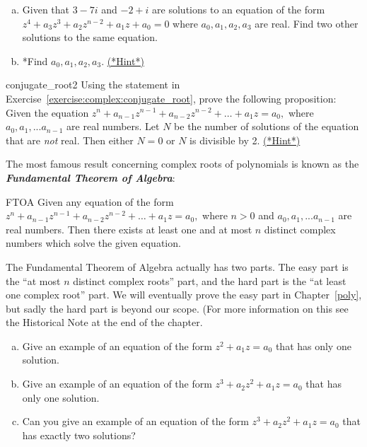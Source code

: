 {\begin{exercise}{62} 
\begin{enumerate}[(a)]
\item
Given that $3 - 7i$ and $-2+i$ are solutions to an equation of the form $z^4 + a_{3}z^{3} + a_{2} z^{n-2}+ a_1 z + a_0 = 0$ where $a_0, a_1, a_2, a_3$ are real. Find two other solutions to the same equation.
\item
*Find $a_0, a_1, a_2, a_3$. 
\hyperref[sec:complex:hints]{(*Hint*)}
\end{enumerate}
\end{exercise}

\begin{exercise}{conjugate_root2}
Using the statement in Exercise~\ref{exercise:complex:conjugate_root}, prove the following proposition:
Given the equation  $z^n + a_{n-1}z^{n-1} + a_{n-2} z^{n-2} + \ldots + a_1 z =a_0,$ where $a_0, a_1, ... a_{n-1}$ are real numbers. Let $N$ be the number of solutions of the equation that are \emph{not} real. Then either $N=0$ or $N$ is divisible by 2. 
\hyperref[sec:complex:hints]{(*Hint*)}
\end{exercise}

The most famous result concerning complex roots of polynomials is known as the {\bf \emph{Fundamental Theorem of Algebra}}:

\begin{prop}{FTOA} Given any equation of the form $z^n + a_{n-1}z^{n-1} + a_{n-2} z^{n-2} + \ldots + a_1 z =a_0,$ where $n>0$ and $a_0, a_1, ... a_{n-1}$ are real numbers. Then there exists at least one and at most $n$ distinct complex numbers which solve the given equation. 
\end{prop}

The Fundamental Theorem of Algebra actually has two parts. The easy part is the ``at most $n$ distinct complex roots'' part, and the hard part is the ``at least one complex root'' part. We will eventually prove the easy part in Chapter~\ref{poly}, but sadly the hard part is beyond our scope. (For more information on this see the Historical Note at the end of the chapter.

\begin{exercise}{70}
\begin{enumerate}[(a)]
\item
Give an example of an equation of the form $z^2 + a_1z = a_0$ that has only one solution.
\item
Give an example of an equation of the form $z^3 + a_2z^2 + a_1 z = a_0$ that has only one solution.
\item
Can you give an example of an equation of the form $z^3 + a_2z^2 + a_1 z = a_0$ that has exactly two solutions?
\end{enumerate}
\end{exercise}

}
